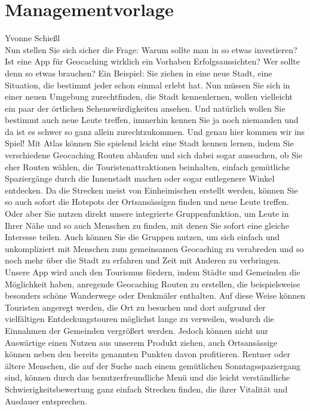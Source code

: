 \documentclass[a4paper, 12pt]{article}
\begin{document}
\section{Managementvorlage}Yvonne Schießl\\
Nun stellen Sie sich sicher die Frage: Warum sollte man in so etwas investieren? Ist eine App für Geocaching wirklich ein Vorhaben Erfolgsaussichten? Wer sollte denn so etwas brauchen?\newline
Ein Beispiel: Sie ziehen in eine neue Stadt, eine Situation, die bestimmt jeder schon einmal erlebt hat. Nun müssen Sie sich in einer neuen Umgebung zurechtfinden, die Stadt kennenlernen, wollen vielleicht ein paar der örtlichen Sehenswürdigkeiten ansehen. Und natürlich wollen Sie bestimmt auch neue Leute treffen, immerhin kennen Sie ja noch niemanden und da ist es schwer so ganz allein zurechtzukommen.
Und genau hier kommen wir ins Spiel!\newline
Mit Atlas können Sie spielend leicht eine Stadt kennen lernen, indem Sie verschiedene Geocaching Routen ablaufen und sich dabei sogar aussuchen, ob Sie eher Routen wählen, die Touristenattraktionen beinhalten, einfach gemütliche Spaziergänge durch die Innenstadt machen oder sogar entlegenere Winkel entdecken. Da die Strecken meist von Einheimischen erstellt werden, können Sie so auch sofort die Hotspots der Ortsansässigen finden und neue Leute treffen.\newline
Oder aber Sie nutzen direkt unsere integrierte Gruppenfunktion, um Leute in Ihrer Nähe und so auch Menschen zu finden, mit denen Sie sofort eine gleiche Interesse teilen. Auch können Sie die Gruppen nutzen, um sich einfach und unkompliziert mit Menschen zum gemeinsamen Geocaching zu verabreden und so noch mehr über die Stadt zu erfahren und Zeit mit Anderen zu verbringen.\newline
Unsere App wird auch den Tourismus fördern, indem Städte und Gemeinden die Möglichkeit haben, anregende Geocaching Routen zu erstellen, die beispielsweise besonders schöne Wanderwege oder Denkmäler enthalten. Auf diese Weise können Touristen angeregt werden, die Ort zu besuchen und dort aufgrund der vielfältigen Entdeckungstouren möglichst lange zu verweilen, wodurch die Einnahmen der Gemeinden  vergrößert werden.\newline
Jedoch können nicht nur Auswärtige einen Nutzen aus unserem Produkt ziehen, auch Ortsansässige können neben den bereits genannten Punkten davon profitieren.\newline
Rentner oder ältere Menschen, die auf der Suche nach einem gemütlichen Sonntagsspaziergang sind, können durch das benutzerfreundliche Menü und die leicht verständliche Schwierigkeitsbewertung ganz einfach Strecken finden, die ihrer Vitalität und Ausdauer entsprechen.
\end{document}
